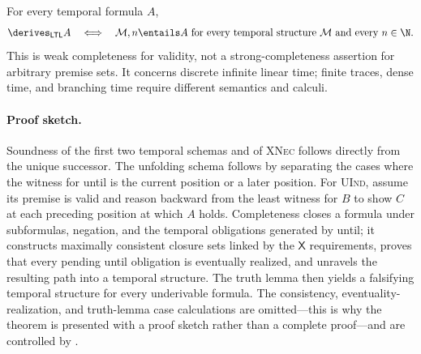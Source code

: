 \begin{theorem}
For every temporal formula \(A\),
\[
  \derives_{\mathsf{LTL}}A
  \quad\Longleftrightarrow\quad
  \mathcal M,n\entails A
  \text{ for every temporal structure \(\mathcal M\) and every \(n\in\N\)}.
\]
This is weak completeness for validity, not a strong-completeness assertion
for arbitrary premise sets.  It concerns discrete infinite linear time;
finite traces, dense time, and branching time require different semantics and
calculi.
\end{theorem}

\paragraph{Proof sketch.}
Soundness of the first two temporal schemas and of
\textsc{XNec} follows directly from the unique successor.  The unfolding
schema follows by separating the cases where the witness for until is the
current position or a later position.  For \textsc{UInd}, assume its premise is
valid and reason backward from the least witness for \(B\) to show \(C\) at
each preceding position at which \(A\) holds.  Completeness closes a formula
under subformulas, negation, and the temporal obligations generated by until;
it constructs maximally consistent closure sets linked by the \(\mathsf X\)
requirements, proves that every pending until obligation is eventually
realized, and unravels the resulting path into a temporal structure.  The
truth
lemma then yields a falsifying temporal structure for every underivable
formula.  The consistency, eventuality-realization, and truth-lemma case
calculations are omitted---this is why the theorem is presented with a
proof sketch rather than a complete proof---and are controlled by
\cite{GabbayPnueliShelahStavi1980}.


